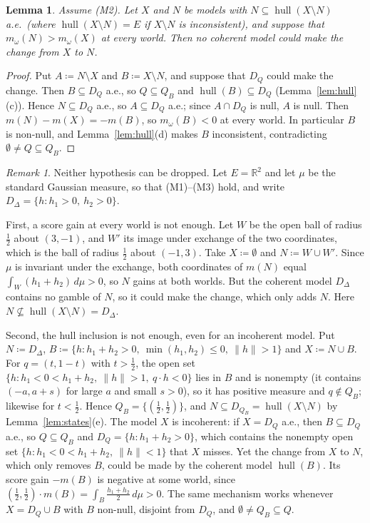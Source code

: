 \documentclass[11pt]{article}
\newcommand{\R}{\mathbb{R}}
\newcommand{\hull}{\operatorname{hull}}
\theoremstyle{plain}
\newtheorem{lemma}[theorem]{Lemma}
\theoremstyle{definition}
\theoremstyle{remark}
\newtheorem{remark}[theorem]{Remark}
\begin{document}
\begin{lemma}\label{lem:change}
Assume (M2). Let $X$ and $N$ be models with $N\subseteq\hull(X\setminus N)$ a.e.\ (where
$\hull(X\setminus N)=E$ if $X\setminus N$ is inconsistent), and suppose that
$m_\omega(N)>m_\omega(X)$ at every world. Then no coherent model could make the change from $X$
to $N$.
\end{lemma}

\begin{proof}
Put $A\coloneqq N\setminus X$ and $B\coloneqq X\setminus N$, and suppose that $D_Q$ could make
the change. Then $B\subseteq D_Q$ a.e., so $Q\subseteq Q_B$ and $\hull(B)\subseteq D_Q$
(Lemma~\ref{lem:hull}(c)). Hence $N\subseteq D_Q$ a.e., so $A\subseteq D_Q$ a.e.; since
$A\cap D_Q$ is null, $A$ is null. Then $m(N)-m(X)=-m(B)$, so $m_\omega(B)<0$ at every world.
In particular $B$ is non-null, and Lemma~\ref{lem:hull}(d) makes $B$ inconsistent,
contradicting $\emptyset\ne Q\subseteq Q_B$.
\end{proof}

\begin{remark}\label{rem:bothneeded}
Neither hypothesis can be dropped. Let $E=\R^2$ and let $\mu$ be the standard Gaussian
measure, so that (M1)--(M3) hold, and write $D_\Delta=\{h:h_1>0,\ h_2>0\}$.

First, a score gain at every world is not enough. Let $W$ be the open ball of radius $\frac12$
about $(3,-1)$, and $W'$ its image under exchange of the two coordinates, which is the ball
of radius $\frac12$ about $(-1,3)$. Take $X\coloneqq\emptyset$ and $N\coloneqq W\cup W'$. Since
$\mu$ is invariant under the exchange, both coordinates of $m(N)$ equal $\int_W(h_1+h_2)\,d\mu
>0$, so $N$ gains at both worlds. But the coherent model $D_\Delta$ contains no gamble of $N$,
so it could make the change, which only adds $N$. Here $N\not\subseteq\hull(X\setminus N)=
D_\Delta$.

Second, the hull inclusion is not enough, even for an incoherent model. Put $N\coloneqq
D_\Delta$, $B\coloneqq\{h:h_1+h_2>0,\ \min(h_1,h_2)\le0,\ \|h\|>1\}$ and $X\coloneqq N\cup B$.
For $q=(t,1-t)$ with $t>\frac12$, the open set $\{h:h_1<0<h_1+h_2,\ \|h\|>1,\ q\cdot h<0\}$ lies
in $B$ and is nonempty (it contains $(-a,a+s)$ for large $a$ and small $s>0$), so it has
positive measure and $q\notin Q_B$; likewise for $t<\frac12$. Hence $Q_B=\{(\frac12,\frac12)\}$,
and $N\subseteq D_{Q_B}=\hull(X\setminus N)$ by Lemma~\ref{lem:states}(e). The model $X$ is
incoherent: if $X=D_Q$ a.e., then $B\subseteq D_Q$ a.e., so $Q\subseteq Q_B$ and $D_Q=\{h:h_1+
h_2>0\}$, which contains the nonempty open set $\{h:h_1<0<h_1+h_2,\ \|h\|<1\}$ that $X$ misses.
Yet the change from $X$ to $N$, which only removes $B$, could be made by the coherent model
$\hull(B)$. Its score gain $-m(B)$ is negative at some world, since $(\frac12,\frac12)\cdot
m(B)=\int_B\frac{h_1+h_2}2\,d\mu>0$. The same mechanism works whenever $X=D_Q\cup B$ with $B$
non-null, disjoint from $D_Q$, and $\emptyset\ne Q_B\subseteq Q$.
\end{remark}
\end{document}
